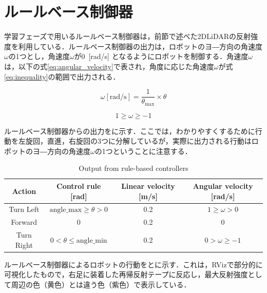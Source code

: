 
\section{ルールベース制御器}

  学習フェーズで用いるルールベース制御器は，前節で述べた2DLiDARの反射強度を利用している．ルールベース制御器の出力は，ロボットのヨ―方向の角速度$\omega$の1つとし，角速度$\omega$が0 \,[rad/s] となるようにロボットを制御する．角速度$\omega$は，以下の式\eqref{eq:angular_velocity}で表され，角度に応じた角速度$\omega$が式\eqref{eq:inequality}の範囲で出力される．

  \begin{equation}
    \omega[\text{rad/s}] = \frac{1}{\theta_{\text{max}}} \times \theta
    \label{eq:angular_velocity}
    \end{equation}

  \begin{equation}
    1 \geq \omega \geq -1
    \label{eq:inequality}
    \end{equation}

  ルールベース制御器からの出力をに示す．ここでは，わかりやすくするために行動を左旋回，直進，右旋回の3つに分解しているが，実際に出力される行動はロボットのヨ―方向の角速度$\omega$の1つということに注意する．

  \begin{table}[h]
    \caption{Output from rule-based controllers}
    \label{tab:output_from_rule-based_controllers}
    \begin{tabular}{|c|c|c|c|}
    \hline
    Action & Control rule {[}rad{]} & Linear velocity {[}m/s{]} & Angular velocity {[}rad/s{]} \\ 
    \hline
    Turn Left & $\text{angle\_max} \geq \theta > 0$ & 0.2 & $1 \geq \omega > 0$ \\ 
    \hline
    Forward & $0$ & 0.2 & $0$ \\ 
    \hline
    Turn Right & $0 < \theta \leq \text{angle\_min}$ & 0.2 & $0 > \omega \geq -1$ \\ 
    \hline
    \end{tabular}
    \end{table}

\newpage

  ルールベース制御器によるロボットの行動をとに示す．これは，RVizで部分的に可視化したもので，右足に装着した再帰反射テープに反応し，最大反射強度として周辺の色（黄色）とは違う色（紫色）で表示している．
  
